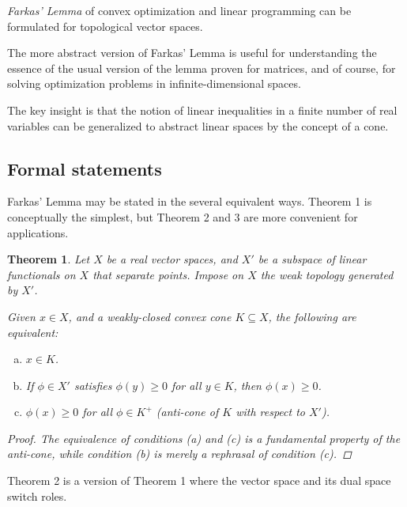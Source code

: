 \documentclass[12pt]{article}
\newtheorem{thm}{Theorem}
\begin{document}


\emph{Farkas' Lemma} of convex optimization
and linear programming can be formulated 
for topological vector spaces.  

The more abstract version of Farkas' Lemma is useful
for understanding the essence of the usual version
of the lemma proven for matrices,
and of course, for solving optimization problems
in infinite-dimensional spaces.

The key insight
is that the notion of linear inequalities in
a finite number of real variables
can be generalized to abstract linear spaces
by the concept of a cone.


\subsection{Formal statements}

Farkas' Lemma may be stated in the several equivalent ways.
Theorem 1 is conceptually the simplest,
but Theorem 2 and 3 are more convenient for applications.

\begin{thm}
Let $X$ be a real vector spaces, and $X'$ be a subspace of linear 
functionals on $X$ that separate points.
Impose on $X$ the weak topology generated by $X'$.

Given $x \in X$, 
and a weakly-closed convex cone $K \subseteq X$,
the following are equivalent:
\begin{enumerate}[(a)]
\item
$x \in K$.
\item
If $\phi \in X'$ satisfies $\phi(y) \geq 0$ for all $y \in K$,
then $\phi(x) \geq 0$.
\item
$\phi(x) \geq 0$ for all $\phi \in K^+$ (anti-cone of $K$ with respect to $X'$).
\end{enumerate}
\begin{proof}
The equivalence of conditions (a) and (c) is a fundamental property
of the anti-cone, while condition (b) is merely
a rephrasal of condition (c).
\end{proof}
\end{thm}


Theorem 2 is a version of Theorem 1 where
the vector space and its dual space switch roles.
\end{document}
